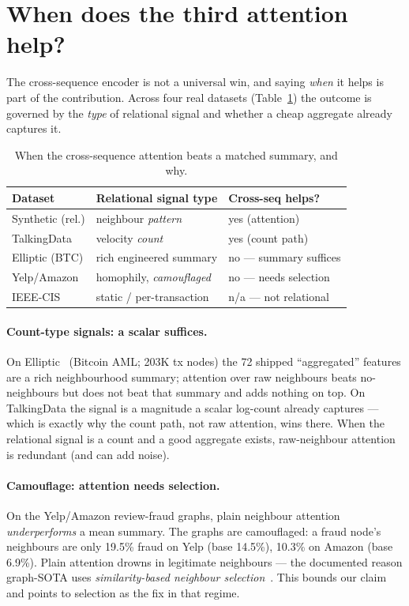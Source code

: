 \section{When does the third attention help?}
\label{sec:boundary}

The cross-sequence encoder is not a universal win, and saying \emph{when} it helps is part of the
contribution. Across four real datasets (Table~\ref{tab:boundary}) the outcome is governed by the
\emph{type} of relational signal and whether a cheap aggregate already captures it.

\begin{table}[t]
\centering
\caption{When the cross-sequence attention beats a matched summary, and why.}
\label{tab:boundary}
\small
\begin{tabular}{lll}
\toprule
Dataset & Relational signal type & Cross-seq helps? \\
\midrule
Synthetic (rel.) & neighbour \emph{pattern} & yes (attention) \\
TalkingData      & velocity \emph{count}    & yes (count path) \\
Elliptic (BTC)   & rich engineered summary  & no --- summary suffices \\
Yelp/Amazon      & homophily, \emph{camouflaged} & no --- needs selection \\
IEEE-CIS         & static / per-transaction & n/a --- not relational \\
\bottomrule
\end{tabular}
\end{table}

\paragraph{Count-type signals: a scalar suffices.} On Elliptic~\cite{weber2019elliptic}
(Bitcoin AML; 203K tx nodes) the
72 shipped ``aggregated'' features are a rich neighbourhood summary; attention over raw neighbours
beats no-neighbours but does not beat that summary and adds nothing on top. On TalkingData the
signal is a magnitude a scalar log-count already captures --- which is exactly why the count path,
not raw attention, wins there. When the relational signal is a count and a good aggregate exists,
raw-neighbour attention is redundant (and can add noise).

\paragraph{Camouflage: attention needs selection.} On the Yelp/Amazon review-fraud graphs, plain
neighbour attention \emph{underperforms} a mean summary. The graphs are camouflaged: a fraud node's
neighbours are only \num{19.5}\% fraud on Yelp (base \num{14.5}\%), \num{10.3}\% on Amazon (base
\num{6.9}\%). Plain attention drowns in legitimate neighbours --- the documented reason graph-SOTA
uses \emph{similarity-based neighbour selection}~\cite{dou2020caregnn,liu2021pcgnn}. This bounds our claim and points to selection as
the fix in that regime.

